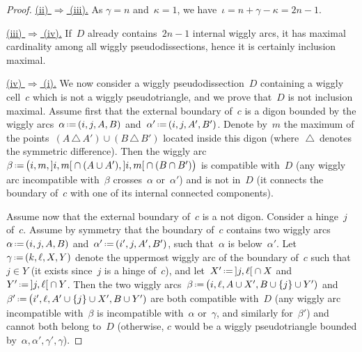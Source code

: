 \documentclass{amsart}
\theoremstyle{definition}
\newcommand{\symdif}{\,\triangle\,} %
\newcommand{\eqdef}{\mbox{\,\raisebox{0.2ex}{\scriptsize\ensuremath{\mathrm:}}\ensuremath{=}\,}} %
\newcommand{\ie}{\textit{i.e.}~} %
\newcommand{\para}[1]{\smallskip\noindent\uline{#1.}} %
\begin{document}
\begin{proof}
\para{(ii) $\Rightarrow$ (iii)}
As $\gamma=n$ and~$\kappa=1$, we have~$\iota = n+\gamma-\kappa = 2n-1$.

%

\para{(iii) $\Rightarrow$ (iv)}
If~$D$ already contains~$2n-1$ internal wiggly arcs, it has maximal cardinality among all wiggly pseudodissections, hence it is certainly inclusion maximal.

\para{(iv) $\Rightarrow$ (i)}
We now consider a wiggly pseudodissection~$D$ containing a wiggly cell~$c$ which is not a wiggly pseudotriangle, and we prove that~$D$ is not inclusion maximal.
%
Assume first that the external boundary of~$c$ is a digon bounded by the wiggly arcs~$\alpha \eqdef (i, j, A, B)$ and~$\alpha' \eqdef (i, j, A', B')$.
Denote by~$m$ the maximum of the points~$(A \symdif A') \cup (B \symdif B')$ located inside this digon (where~$\symdif$ denotes the symmetric difference).
Then the wiggly arc~$\beta \eqdef \big( i, m, {]i,m[} \cap (A \cup A'), {]i,m[} \cap (B \cap B') \big)$ is compatible with~$D$ (any wiggly arc incompatible with~$\beta$ crosses~$\alpha$ or~$\alpha'$) and is not in~$D$ (it connects the boundary of~$c$ with one of its internal connected components).

Assume now that the external boundary of~$c$ is a not digon.
Consider a hinge~$j$ of~$c$.
Assume by symmetry that the boundary of~$c$ contains two wiggly arcs~$\alpha \eqdef (i, j, A, B)$ and~$\alpha' \eqdef (i', j, A', B')$, such that~$\alpha$ is below~$\alpha'$. %
Let~$\gamma \eqdef (k, \ell, X, Y)$ denote the uppermost wiggly arc of the boundary of~$c$ such that~$j \in Y$ (it exists since~$j$ is a  hinge of~$c$), and let~$X' \eqdef {]j,\ell[} \cap X$ and~$Y' \eqdef {]j,\ell[} \cap Y$.
Then the two wiggly arcs~$\beta \eqdef \big( i, \ell, A \cup X', B \cup \{j\} \cup Y')$ and~$\beta' \eqdef \big( i', \ell, A'  \cup \{j\} \cup X', B \cup Y')$ are both compatible with~$D$ (any wiggly arc incompatible with~$\beta$ is incompatible with~$\alpha$ or~$\gamma$, and similarly for~$\beta'$) and cannot both belong to~$D$ (otherwise, $c$ would be a wiggly pseudotriangle bounded by~$\alpha, \alpha', \gamma', \gamma$).
\end{proof}
\end{document}

